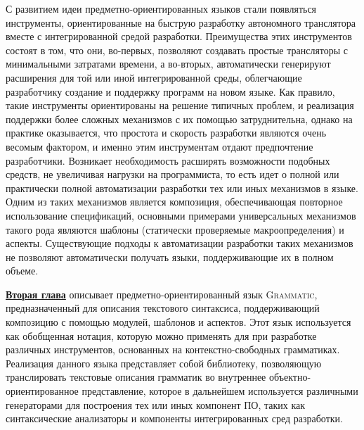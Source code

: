 \documentclass[12pt,a4paper]{article}
\newcommand{\tool}[1]{\textsc{#1}}
\theoremstyle{definition}
\theoremstyle{plain}
\newcommand{\GRM}{\tool{Grammatic}}
\newcommand{\afsubsection}[1]{\par \textbf{\underline{#1}}}
\begin{document}
С развитием идеи предметно-ориентированных языков стали появляться инструменты, ориентированные на быструю разработку автономного транслятора вместе с интегрированной средой разработки. Преимущества этих инструментов состоят в том, что они, во-первых, позволяют создавать простые трансляторы с минимальными затратами времени, а во-вторых, автоматически генерируют расширения для той или иной интегрированной среды, облегчающие разработчику создание и поддержку программ на новом языке. Как правило, такие инструменты ориентированы на решение типичных проблем, и реализация поддержки более сложных механизмов с их помощью затруднительна, однако на практике оказывается, что простота и скорость разработки являются очень весомым фактором, и именно этим инструментам отдают предпочтение разработчики. Возникает необходимость расширять возможности подобных средств, не увеличивая нагрузки на программиста, то есть идет о полной или практически полной автоматизации разработки тех или иных механизмов в языке. Одним из таких механизмов является композиция, обеспечивающая повторное использование спецификаций, основными примерами универсальных механизмов такого рода являются шаблоны (статически проверяемые макроопределения) и аспекты. Существующие подходы к автоматизации разработки таких механизмов не позволяют автоматически получать языки, поддерживающие их в полном объеме.

\afsubsection{Вторая глава} описывает предметно-ориентированный язык \GRM{}, предназначенный для описания текстового синтаксиса, поддерживающий композицию с помощью модулей, шаблонов и аспектов. Этот язык используется как обобщенная нотация, которую можно применять для при разработке различных инструментов, основанных на контекстно-свободных грамматиках. Реализация данного языка представляет собой библиотеку, позволяющую транслировать текстовые описания грамматик во внутреннее объектно-ориентированное представление, которое в дальнейшем используется различными генераторами для построения тех или иных компонент ПО, таких как синтаксические анализаторы и компоненты интегрированных сред разработки.
\end{document}

